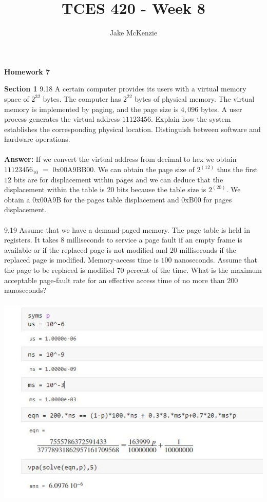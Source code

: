 \documentclass[12pt]{article}
\begin{document}
\title{TCES 420 - Week 8}
\author{Jake McKenzie}
\maketitle
\noindent\centerline{\textbf{Homework 7}}
\textbf{Section 1}
9.18 A certain computer provides its users with a virtual memory space of
$2^{32}$ bytes. The computer has $2^{22}$ bytes of physical memory. The virtual
memory is implemented by paging, and the page size is $4,096$ bytes.
A user process generates the virtual address $11123456$. Explain how
the system establishes the corresponding physical location. Distinguish
between software and hardware operations.\\\\
\textbf{Answer: } If we convert the virtual address from decimal to 
hex we obtain $11123456_{10}$ $=$ $0$x$00$A$9$BB$00$. We can obtain the 
page size of $2^(12)$ thus the first $12$ bits are for displacement within pages 
and we can deduce that the displacement within the table is $20$ bits 
because the table size is $2^(20)$. We obtain a $0$x$00$A$9$B for the pages 
table displacement and $0$xB$00$ for pages displacement.\\\\
9.19 Assume that we have a demand-paged memory. The page table is held in
registers. It takes 8 milliseconds to service a page fault if an empty frame
is available or if the replaced page is not modified and $20$ milliseconds if
the replaced page is modified. Memory-access time is $100$ nanoseconds.
Assume that the page to be replaced is modified $70$ percent of the
time. What is the maximum acceptable page-fault rate for an effective
access time of no more than $200$ nanoseconds?\\\\
\includegraphics[scale = 1]{q19.JPG}\\
\end{document}
